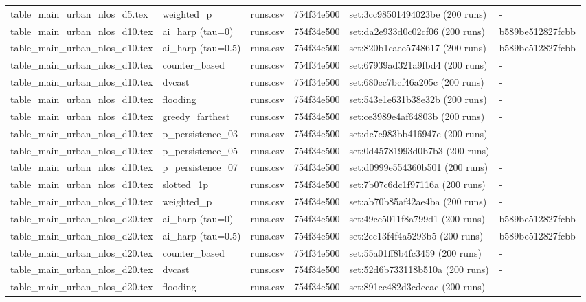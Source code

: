 \begin{tabular}{llllll}
table\_main\_urban\_nlos\_d5.tex & weighted\_p & runs.csv & 754f34e500 & set:3cc98501494023be (200 runs) & - \\
table\_main\_urban\_nlos\_d10.tex & ai\_harp (tau=0) & runs.csv & 754f34e500 & set:da2e933d0c02cf06 (200 runs) & b589be512827fcbb \\
table\_main\_urban\_nlos\_d10.tex & ai\_harp (tau=0.5) & runs.csv & 754f34e500 & set:820b1caee5748617 (200 runs) & b589be512827fcbb \\
table\_main\_urban\_nlos\_d10.tex & counter\_based & runs.csv & 754f34e500 & set:67939ad321a9fbd4 (200 runs) & - \\
table\_main\_urban\_nlos\_d10.tex & dvcast & runs.csv & 754f34e500 & set:680cc7bcf46a205c (200 runs) & - \\
table\_main\_urban\_nlos\_d10.tex & flooding & runs.csv & 754f34e500 & set:543e1e631b38e32b (200 runs) & - \\
table\_main\_urban\_nlos\_d10.tex & greedy\_farthest & runs.csv & 754f34e500 & set:ce3989e4af64803b (200 runs) & - \\
table\_main\_urban\_nlos\_d10.tex & p\_persistence\_03 & runs.csv & 754f34e500 & set:dc7e983bb416947e (200 runs) & - \\
table\_main\_urban\_nlos\_d10.tex & p\_persistence\_05 & runs.csv & 754f34e500 & set:0d45781993d0b7b3 (200 runs) & - \\
table\_main\_urban\_nlos\_d10.tex & p\_persistence\_07 & runs.csv & 754f34e500 & set:d0999e554360b501 (200 runs) & - \\
table\_main\_urban\_nlos\_d10.tex & slotted\_1p & runs.csv & 754f34e500 & set:7b07c6dc1f97116a (200 runs) & - \\
table\_main\_urban\_nlos\_d10.tex & weighted\_p & runs.csv & 754f34e500 & set:ab70b85af42ae4ba (200 runs) & - \\
table\_main\_urban\_nlos\_d20.tex & ai\_harp (tau=0) & runs.csv & 754f34e500 & set:49cc5011f8a799d1 (200 runs) & b589be512827fcbb \\
table\_main\_urban\_nlos\_d20.tex & ai\_harp (tau=0.5) & runs.csv & 754f34e500 & set:2ec13f4f4a5293b5 (200 runs) & b589be512827fcbb \\
table\_main\_urban\_nlos\_d20.tex & counter\_based & runs.csv & 754f34e500 & set:55a01ff8b4fc3459 (200 runs) & - \\
table\_main\_urban\_nlos\_d20.tex & dvcast & runs.csv & 754f34e500 & set:52d6b733118b510a (200 runs) & - \\
table\_main\_urban\_nlos\_d20.tex & flooding & runs.csv & 754f34e500 & set:891cc482d3cdccac (200 runs) & - \\

\end{tabular}
